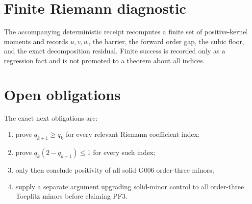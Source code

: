 \section{Finite Riemann diagnostic}

The accompanying deterministic receipt recomputes a finite set of
positive-kernel moments and records \(u,v,w\), the barrier, the forward order
gap, the cubic floor, and the exact decomposition residual. Finite success is
recorded only as a regression fact and is not promoted to a theorem about all
indices.

\section{Open obligations}

The exact next obligations are:
\begin{enumerate}
  \item prove \(q_{k+1}\ge q_k\) for every relevant Riemann coefficient index;
  \item prove \(q_k(2-q_{k-1})\le1\) for every such index;
  \item only then conclude positivity of all solid G006 order-three minors;
  \item supply a separate argument upgrading solid-minor control to all
        order-three Toeplitz minors before claiming PF3.
\end{enumerate}


